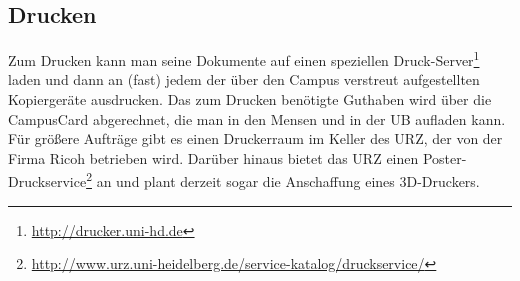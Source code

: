 
\subsection*{Drucken}

Zum Drucken kann man seine Dokumente auf einen speziellen Druck-Server\footnote{\url{http://drucker.uni-hd.de}} laden und dann an (fast) jedem der über den Campus verstreut aufgestellten Kopiergeräte ausdrucken.
Das zum Drucken benötigte Guthaben wird über die CampusCard abgerechnet, die man in den Mensen und in der \gls{UB} aufladen kann. Für größere Aufträge gibt es einen Druckerraum im Keller des \gls{URZ}, der von der Firma Ricoh betrieben wird.
Darüber hinaus bietet das URZ einen Poster-Druckservice\footnote{\url{http://www.urz.uni-heidelberg.de/service-katalog/druckservice/}} an und plant derzeit sogar die Anschaffung eines 3D-Druckers.

